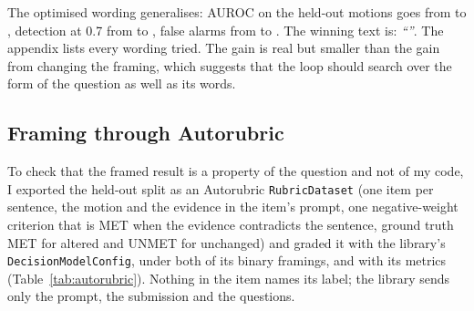 \documentclass[11pt,a4paper]{article}
\begin{document}
\begin{table}[t]
\centering\small
{}
\caption{Held-out criterion optimisation. The training columns are on the 400-pair sample the loop saw; the held-out columns are on the \nTest{} pairs from motions it never saw.}
\label{tab:optimize}
\end{table}

The optimised wording generalises: AUROC on the held-out motions goes from \optSeedTestAuroc{} to \optBestTestAuroc{}, detection at 0.7 from \optSeedTestDet{} to \optBestTestDet{}, false alarms from \optSeedTestFa{} to \optBestTestFa{}. The winning text is: \emph{``\unskip''}. The appendix lists every wording tried. The gain is real but smaller than the gain from changing the framing, which suggests that the loop should search over the form of the question as well as its words.

\subsection{Framing through Autorubric}
\label{sec:framing}

To check that the framed result is a property of the question and not of my code, I exported the held-out split as an Autorubric \texttt{RubricDataset} (one item per sentence, the motion and the evidence in the item's prompt, one negative-weight criterion that is MET when the evidence contradicts the sentence, ground truth MET for altered and UNMET for unchanged) and graded it with the library's \texttt{DecisionModelConfig}, under both of its binary framings, and with its metrics (Table~\ref{tab:autorubric}). Nothing in the item names its label; the library sends only the prompt, the submission and the questions.

\begin{table}[t]
\centering\small
{}
\caption{The held-out split graded with the Autorubric library as released. \texttt{noul\_framed} is a yes/no question with the MET/UNMET definitions; \texttt{choice} offers MET, UNMET and CANNOT\_ASSESS. Intervals are the library's bootstrap over items.}
\label{tab:autorubric}
\end{table}
\end{document}

